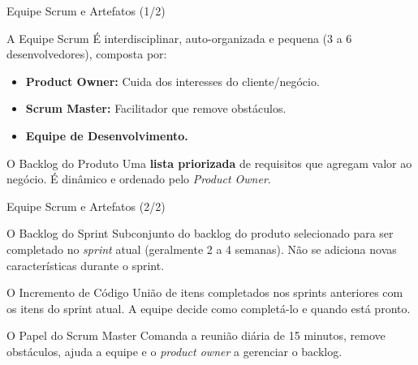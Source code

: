\documentclass[aspectratio=169, 9pt]{beamer}
\begin{document}
\begin{frame}{Equipe Scrum e Artefatos (1/2)}
  \begin{block}{A Equipe Scrum}
    É interdisciplinar, auto-organizada e pequena (3 a 6 desenvolvedores), composta por:
    \begin{itemize}
      \item \textbf{Product Owner:} Cuida dos interesses do cliente/negócio.
      \item \textbf{Scrum Master:} Facilitador que remove obstáculos.
      \item \textbf{Equipe de Desenvolvimento.}
    \end{itemize}
  \end{block}

  \vspace{0.2cm}
  \begin{block}{O Backlog do Produto}
    Uma \textbf{lista priorizada} de requisitos que agregam valor ao negócio. É dinâmico e ordenado pelo \textit{Product Owner}.
  \end{block}
\end{frame}

\begin{frame}{Equipe Scrum e Artefatos (2/2)}
  \begin{block}{O Backlog do Sprint}
    Subconjunto do backlog do produto selecionado para ser completado no \textit{sprint} atual (geralmente 2 a 4 semanas). Não se adiciona novas características durante o sprint.
  \end{block}

  \vspace{0.2cm}
  \begin{block}{O Incremento de Código}
    União de itens completados nos sprints anteriores com os itens do sprint atual. A equipe decide como completá-lo e quando está pronto.
  \end{block}
  
  \vspace{0.2cm}
  \begin{block}{O Papel do Scrum Master}
    Comanda a reunião diária de 15 minutos, remove obstáculos, ajuda a equipe e o \textit{product owner} a gerenciar o backlog.
  \end{block}
\end{frame}
\end{document}
